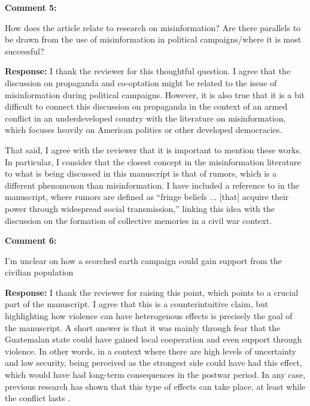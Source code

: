 \documentclass[12pt, a4paper, notitlepage]{article}
\begin{document}
\vspace{15pt}
\noindent\textbf{Comment 5:}
\begin{displayquote}
How does the article relate to research on misinformation? Are there parallels to be drawn from the use of misinformation in political campaigns/where it is most successful?
\end{displayquote}

\noindent\textbf{Response:} I thank the reviewer for this thoughtful question. I agree that the discussion on propaganda and co-optation might be related to the issue of misinformation during political campaigns. However, it is also true that it is a bit difficult to connect this discussion on propaganda in the context of an armed conflict in an underdeveloped country with the literature on misinformation, which focuses heavily on American politics or other developed democracies.

That said, I agree with the reviewer that it is important to mention these works. In particular, I consider that the closest concept in the misinformation literature to what is being discussed in this manuscript is that of rumors, which is a different phenomenon than misinformation. I have included a reference to \citet[243]{Berinsky:2017ty} in the manuscript, where rumors are defined as ``fringe beliefs ... [that] acquire their power through widespread social transmission,'' linking this idea with the discussion on the formation of collective memories in a civil war context.

\vspace{15pt}
\noindent\textbf{Comment 6:}
\begin{displayquote}
I'm unclear on how a scorched earth campaign could gain support from the civilian population
\end{displayquote}

\noindent\textbf{Response:} I thank the reviewer for raising this point, which points to a crucial part of the manuscript. I agree that this is a counterintuitive claim, but highlighting how violence can have heterogenous effects is precisely the goal of the manuscript.
A short answer is that it was mainly through fear that the Guatemalan state could have gained local cooperation and even support through violence. In other words, in a context where there are high levels of uncertainty and low security, being perceived as the strongest side could have had this effect, which would have had long-term consequences in the postwar period. In any case, previous research has shown that this type of effects can take place, at least while the conflict lasts \citep{Schubiger:2021aa}.
\end{document}
